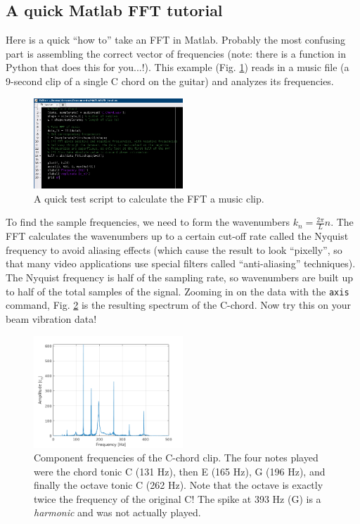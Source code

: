 \documentclass[12pt]{article}
\begin{document}
\subsection{A quick Matlab FFT tutorial}
Here is a quick ``how to'' take an FFT in Matlab. Probably the most confusing part is assembling the correct vector of frequencies (note: there is a function in Python that does this for you...!). This example (Fig. \ref{fftex}) reads in a music file (a 9-second clip of a single C chord on the guitar) and analyzes its frequencies.
\begin{figure}[h]
  \centering
  \includegraphics[width=0.5\textwidth]{matlab_fft_test}
  \caption{A quick test script to calculate the FFT a music clip.}\label{fftex}
\end{figure}
To find the sample frequencies, we need to form the wavenumbers $k_n = \frac{2\pi}{L}n$. The FFT calculates the wavenumbers up to a certain cut-off rate called the Nyquist frequency to avoid aliasing effects (which cause the result to look ``pixelly'', so that many video applications use special filters called ``anti-aliasing'' techniques). The Nyquist frequency is half of the sampling rate, so wavenumbers are built up to half of the total samples of the signal. Zooming in on the data with the \texttt{axis} command, Fig. \ref{cchord} is the resulting spectrum of the C-chord. Now try this on your beam vibration data!
\begin{figure}[h]
  \centering
  \includegraphics[width=0.5\textwidth]{woop}
  \caption{Component frequencies of the C-chord clip. The four notes played were the chord tonic C (131 Hz), then E (165 Hz), G (196 Hz), and finally the octave tonic C (262 Hz). Note that the octave is exactly twice the frequency of the original C! The spike at 393 Hz (G) is a \textit{harmonic} and was not actually played.}\label{cchord}
\end{figure}
\end{document}
